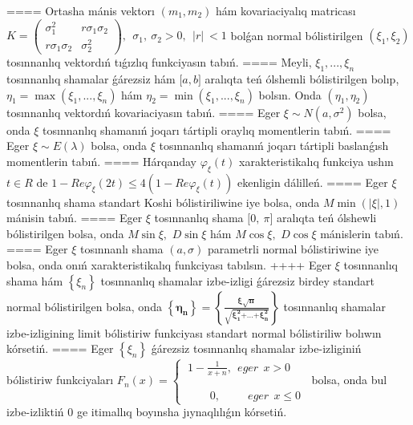 ====
Ortasha mánis vektorı \(\left( m_{1},m_{2} \right)\) hám kovariaciyalıq matricası\(K = \begin{pmatrix}
\sigma_{1}^{2} & r\sigma_{1}\sigma_{2} \\
r\sigma_{1}\sigma_{2} & \sigma_{2}^{2}
\end{pmatrix},\ \ \sigma_{1},\ \sigma_{2} > 0,\ \ |r|\  < 1\) bolǵan normal bólistirilgen \(\left( \xi_{1},\xi_{2} \right)\) tosınnanlıq vektordıń tıǵızlıq funkciyasın tabıń.
====
Meyli, \(\xi_{1},...,\xi_{n}\) tosınnanlıq shamalar ǵárezsiz hám \(\lbrack a,b\rbrack\) aralıqta teń ólshemli bólistirilgen bolıp, \(\eta_{1} = \max\left( \xi_{1},...,\xi_{n} \right)\) hám \(\eta_{2} = \min\left( \xi_{1},...,\xi_{n} \right)\) bolsın. Onda \(\left( \eta_{1},\eta_{2} \right)\) tosınnanlıq vektordıń kovariaciyasın tabıń.
====
Eger \(\xi\sim N\left( a,\sigma^{2} \right)\) bolsa, onda \(\xi\) tosınnanlıq shamanıń joqarı tártipli oraylıq momentlerin tabıń.
====
Eger \(\xi\sim E(\lambda)\) bolsa, onda \(\xi\) tosınnanlıq shamanıń joqarı tártipli baslanǵısh momentlerin tabıń.
====
Hárqanday \(\varphi_{\xi}(t)\) xarakteristikalıq funkciya ushın \(t \in R\) de \(1 - Re\varphi_{\xi}(2t) \leq 4\left( 1 - Re\varphi_{\xi}(t) \right)\) ekenligin dálilleń.
====
Eger \(\xi\) tosınnanlıq shama standart Koshi bólistiriliwine iye bolsa, onda \(M\min\left( |\xi|,1 \right)\) mánisin tabıń.
====
Eger \(\xi\) tosınnanlıq shama \(\lbrack 0,\ \pi\rbrack\) aralıqta teń ólshewli bólistirilgen bolsa, onda \(M\sin\xi,\) \(D\sin\xi\) hám \(M\cos\xi,\) \(D\cos\xi\) mánislerin tabıń.
====
Eger \(\xi\) tosınnanlı shama \((a,\sigma)\) parametrli normal bólistiriwine iye bolsa, onda onıń xarakteristikalıq funkciyası tabılsın.
++++
Eger \(\xi\) tosınnanlıq shama hám \(\left\{ \xi_{n} \right\}\) tosınnanlıq shamalar izbe-izligi ǵárezsiz birdey standart normal bólistirilgen bolsa, onda \(\left\{ \mathbf{\eta}_{\mathbf{n}} \right\}\mathbf{=}\left\{ \frac{\mathbf{\xi}\sqrt{\mathbf{n}}}{\sqrt{\mathbf{\xi}_{\mathbf{1}}^{\mathbf{2}}\mathbf{+}\mathbf{...}\mathbf{+}\mathbf{\xi}_{\mathbf{n}}^{\mathbf{2}}}} \right\}\) tosınnanlıq shamalar izbe-izligining limit bólistiriw funkciyası standart normal bólistiriliw bolıwın kórsetiń.
====
Eger \(\left\{ \xi_{n} \right\}\) ǵárezsiz tosınnanlıq shamalar izbe-izliginiń bólistiriw funkciyaları \(F_{n}(x) = \left\{ \begin{matrix}
\ 1 - \frac{1}{x + n},\ \ eger\ \ x > 0 \\
 \\
 \\
\ \ \ \ \ \ \ \ \ \ 0,\ \ \ \ \ \ \ \ \ \ \ eger\ \ x \leq 0
\end{matrix} \right.\ \) bolsa, onda bul izbe-izliktiń 0 ge itimallıq boyınsha jıynaqlılıǵın kórsetiń.
